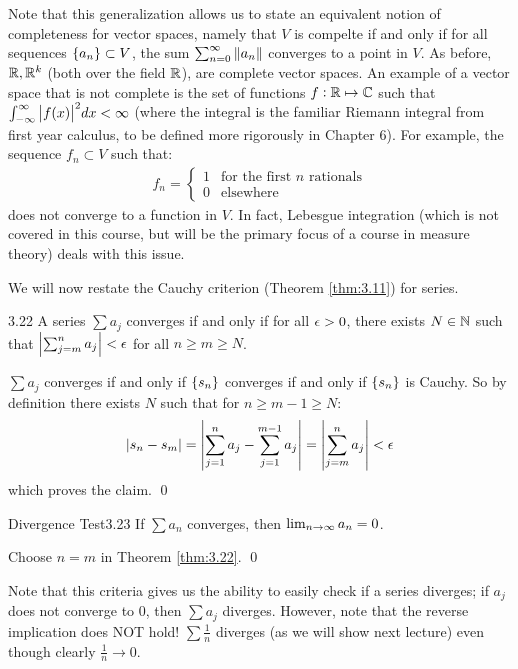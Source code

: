 Note that this generalization allows us to state an equivalent notion of completeness for vector spaces, namely that $V$ is compelte if and only if for all sequences $\set{a_n} \subset V$, the sum $\sum_{n=0}^\infty \norm{a_n}$ converges to a point in $V$. As before, $\mathbb{R}, \mathbb{R}^k$ (both over the field $\mathbb{R}$), are complete vector spaces. An example of a vector space that is not complete is the set of functions $f: \mathbb{R} \mapsto \mathbb{C}$ such that $\int_{-\infty}^\infty \abs{f(x)}^2 dx < \infty$ (where the integral is the familiar Riemann integral from first year calculus, to be defined more rigorously in Chapter 6). For example, the sequence $f_n \subset V$ such that:
\begin{align*}
    f_n = \begin{cases}
        1 & \text{for the first $n$ rationals}
        \\ 0 & \text{elsewhere}
    \end{cases}
\end{align*}
does not converge to a function in $V$. In fact, Lebesgue integration (which is not covered in this course, but will be the primary focus of a course in measure theory) deals with this issue.

We will now restate the Cauchy criterion (Theorem \ref{thm:3.11}) for series.

\begin{theorem}{}{3.22}
    A series $\sum a_j$ converges if and only if for all $\epsilon > 0$, there exists $N \in \mathbb{N}$ such that $\abs{\sum_{j=m}^n a_j} < \epsilon$ for all $n \geq m \geq N$.
\end{theorem}
\begin{nproof}
    $\sum a_j$ converges if and only if $\set{s_n}$ converges if and only if $\set{s_n}$ is Cauchy. So by definition there exists $N$ such that for $n \geq m - 1 \geq N$:
    \begin{align*}
        \abs{s_n - s_m} = \abs{\sum_{j=1}^n a_j - \sum_{j=1}^{m-1} a_j} = \abs{\sum_{j=m}^n a_j} < \epsilon
    \end{align*}
    which proves the claim. \qed
\end{nproof}

\begin{theorem}{Divergence Test}{3.23}
    If $\sum a_n$ converges, then $\lim_{n \rightarrow \infty} a_n = 0$.
\end{theorem}
\begin{nproof}
    Choose $n = m$ in Theorem \ref{thm:3.22}. \qed
\end{nproof}
\noindent Note that this criteria gives us the ability to easily check if a series diverges; if $a_j$ does not converge to $0$, then $\sum a_j$ diverges. However, note that the reverse implication does NOT hold! $\sum \frac{1}{n}$ diverges (as we will show next lecture) even though clearly $\frac{1}{n} \rightarrow 0$. 

